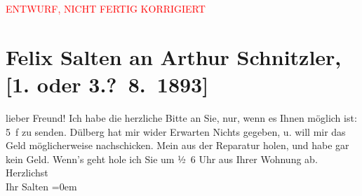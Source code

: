 
\begin{center}
            \textcolor{red}{ENTWURF, NICHT FERTIG KORRIGIERT}
                      \end{center}
            
         
         \renewcommand{\erwaehntePersonen}{Personen: Karl Dülberg}
         \renewcommand{\erwaehnteOrte}{Orte: Wien}
         \renewcommand{\erwaehnteWerke}{}
               \section[Felix Salten an Arthur Schnitzler, {[}1. oder 3.? 8. 1893{]}]{ Felix Salten an Arthur Schnitzler, {[}1. oder
               3.? 8. 1893{]}}\nopagebreak{}\rehead{ }\begin{ledgroupsized}[t]{13cm}\normalsize\beginnumbering \toendnotes[C]{\smallbreak\pagebreak[2]} 
\toendnotes[C]{\smallbreak}\pstart
           \noindent{}{\pb}lieber Freund! Ich habe die herzliche Bitte an Sie, nur, wenn es
               Ihnen möglich ist: 5 f zu senden. Dülberg hat mir wider Erwarten Nichts gegeben, u. will mir das Geld
               möglicherweise nachschicken. Mein \label{K_L03124-1v}\label{K_L03124-1h} aus der Re{\pb}paratur holen, und habe gar kein
               Geld. Wenn's geht hole ich Sie um ½ 6 Uhr aus Ihrer Wohnung ab.\pend
           \pstart
           Herzlichst {\\[\baselineskip]}Ihr \spacefill\mbox{Salten}\pend
           \leftskip=0em{}
         
         \endnumbering{}\end{ledgroupsized}\begin{anhang}\end{anhang}\newcommand{\dateiname}{L03124}\newcommand{\titel}{Felix Salten an Arthur Schnitzler, [1. oder 3.? 8. 1893]}\newcommand{\editorInnen}{Martin Anton Müller und Laura Untner}
      